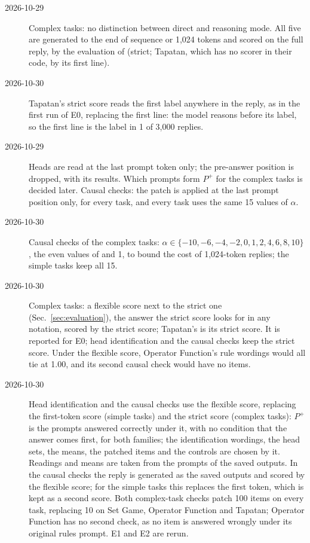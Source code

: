 \documentclass[11pt,a4paper]{article}
\begin{document}
\begin{description}
\item[2026-10-29] Complex tasks: no distinction between direct and reasoning mode. All five are generated to the end of sequence or 1,024 tokens and scored on the full reply, by the evaluation of \citet{fu2026rules} (strict; Tapatan, which has no scorer in their code, by its first line).
\item[2026-10-30] Tapatan's strict score reads the first label anywhere in the reply, as in the first run of E0, replacing the first line: the model reasons before its label, so the first line is the label in 1 of 3,000 replies.
\item[2026-10-29] Heads are read at the last prompt token only; the pre-answer position is dropped, with its results. Which prompts form $P^{+}$ for the complex tasks is decided later. Causal checks: the patch is applied at the last prompt position only, for every task, and every task uses the same 15 values of $\alpha$.
\item[2026-10-30] Causal checks of the complex tasks: $\alpha\in\{-10,-6,-4,-2,0,1,2,4,6,8,10\}$, the even values of \citet{yang2026shared} and 1, to bound the cost of 1,024-token replies; the simple tasks keep all 15.
\item[2026-10-30] Complex tasks: a flexible score next to the strict one (Sec.~\ref{sec:evaluation}), the answer the strict score looks for in any notation, scored by the strict score; Tapatan's is its strict score. It is reported for E0; head identification and the causal checks keep the strict score. Under the flexible score, Operator Function's rule wordings would all tie at 1.00, and its second causal check would have no items.
\item[2026-10-30] Head identification and the causal checks use the flexible score, replacing the first-token score (simple tasks) and the strict score (complex tasks): $P^{+}$ is the prompts answered correctly under it, with no condition that the answer comes first, for both families; the identification wordings, the head sets, the means, the patched items and the controls are chosen by it. Readings and means are taken from the prompts of the saved outputs. In the causal checks the reply is generated as the saved outputs and scored by the flexible score; for the simple tasks this replaces the first token, which is kept as a second score. Both complex-task checks patch 100 items on every task, replacing 10 on Set Game, Operator Function and Tapatan; Operator Function has no second check, as no item is answered wrongly under its original rules prompt. E1 and E2 are rerun.

\end{description}
\end{document}
